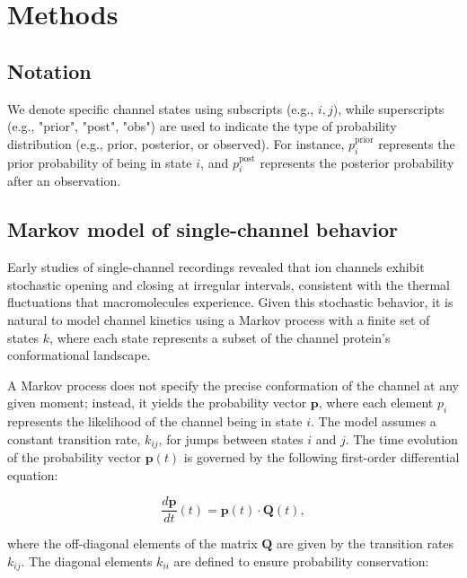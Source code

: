 \documentclass[pdflatex,sn-mathphys-num]{sn-jnl}%
\theoremstyle{thmstyleone}%
\theoremstyle{thmstyletwo}%
\theoremstyle{thmstylethree}%
\begin{document}
\section{Methods}
\label{sec:methods}

\subsection{Notation}
We denote specific channel states using subscripts (e.g., \( i, j \)), while superscripts (e.g., "prior", "post", "obs") are used to indicate the type of probability distribution (e.g., prior, posterior, or observed). For instance, \( p_i^{\text{prior}} \) represents the prior probability of being in state \( i \), and \( p_i^{\text{post}} \) represents the posterior probability after an observation.

\subsection{Markov model of single-channel behavior}

Early studies of single-channel recordings revealed that ion channels exhibit stochastic opening and closing at irregular intervals, consistent with the thermal fluctuations that macromolecules experience. Given this stochastic behavior, it is natural to model channel kinetics using a Markov process with a finite set of states \( k \), where each state represents a subset of the channel protein’s conformational landscape. 

A Markov process does not specify the precise conformation of the channel at any given moment; instead, it yields the probability vector \( \boldsymbol{p} \), where each element \( p_i \) represents the likelihood of the channel being in state \( i \). The model assumes a constant transition rate, \( k_{ij} \), for jumps between states \( i \) and \( j \). The time evolution of the probability vector \( \boldsymbol{p}(t) \) is governed by the following first-order differential equation:

\begin{equation}
	\frac{d \boldsymbol{p}}{dt}(t) = \boldsymbol{p}(t) \cdot \boldsymbol{Q}(t),
	\label{eq:master_equation}
\end{equation}

where the off-diagonal elements of the matrix \( \boldsymbol{Q} \) are given by the transition rates \( k_{ij} \). The diagonal elements \( k_{ii} \) are defined to ensure probability conservation:
\end{document}

